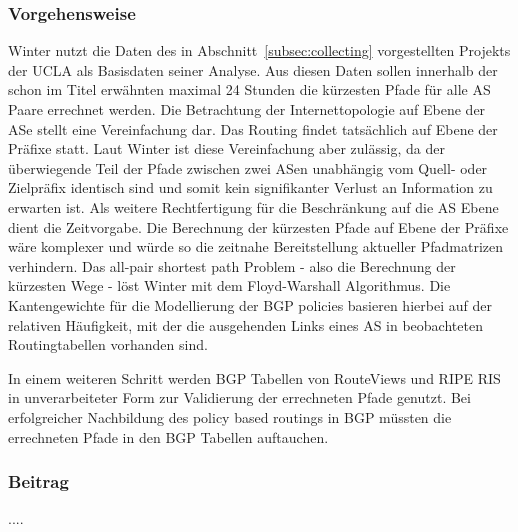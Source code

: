 \subsubsection{Vorgehensweise}
Winter nutzt die Daten des in Abschnitt~\ref{subsec:collecting} vorgestellten Projekts der UCLA als Basisdaten seiner Analyse.
Aus diesen Daten sollen innerhalb der schon im Titel erwähnten maximal 24 Stunden die kürzesten Pfade für alle AS Paare errechnet werden.
Die Betrachtung der Internettopologie auf Ebene der ASe stellt eine Vereinfachung dar.
Das Routing findet tatsächlich auf Ebene der Präfixe statt.
Laut Winter ist diese Vereinfachung aber zulässig, da der überwiegende Teil der Pfade zwischen zwei ASen unabhängig vom Quell- oder Zielpräfix identisch sind und somit kein signifikanter Verlust an Information zu erwarten ist.
Als weitere Rechtfertigung für die Beschränkung auf die AS Ebene dient die Zeitvorgabe.
Die Berechnung der kürzesten Pfade auf Ebene der Präfixe wäre komplexer und würde so die zeitnahe Bereitstellung aktueller Pfadmatrizen verhindern.
Das all-pair shortest path Problem - also die Berechnung der kürzesten Wege - löst Winter mit dem Floyd-Warshall Algorithmus.
Die Kantengewichte für die Modellierung der BGP policies basieren hierbei auf der relativen Häufigkeit, mit der die ausgehenden Links eines AS in beobachteten Routingtabellen vorhanden sind.

In einem weiteren Schritt werden BGP Tabellen von RouteViews und RIPE RIS in unverarbeiteter Form zur Validierung der errechneten Pfade genutzt.
Bei erfolgreicher Nachbildung des policy based routings in BGP müssten die errechneten Pfade in den BGP Tabellen auftauchen.


\subsubsection{Beitrag}
....
